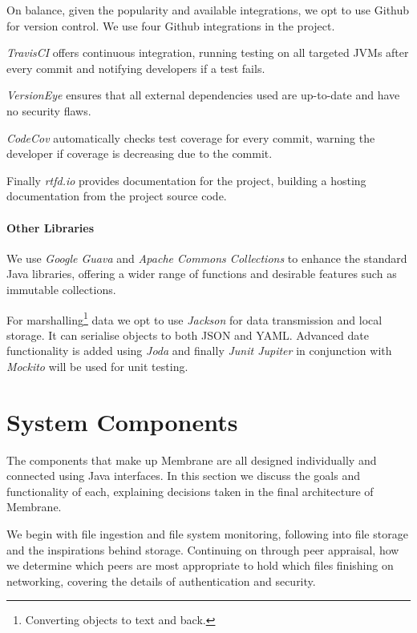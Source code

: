\documentclass[11pt, a4paper, twoside]{report}
\begin{document}
On balance, given the popularity and available integrations, we opt to use Github for version control. We use four Github integrations in the project.

\emph{TravisCI} offers continuous integration, running testing on all targeted JVMs after every commit and notifying developers if a test fails.

\emph{VersionEye} ensures that all external dependencies used are up-to-date and have no security flaws.

\emph{CodeCov} automatically checks test coverage for every commit, warning the developer if coverage is decreasing due to the commit.

Finally \emph{rtfd.io} provides documentation for the project, building a hosting documentation from the project source code.

\subsubsection{Other Libraries}

We use \emph{Google Guava} and \emph{Apache Commons Collections} to enhance the standard Java libraries, offering a wider range of functions and desirable features such as immutable collections.

For marshalling\footnote{Converting objects to text and back.} data we opt to use \emph{Jackson} for data transmission and local storage. It can serialise objects to both JSON and YAML. Advanced date functionality is added using \emph{Joda} and finally \emph{Junit Jupiter} in conjunction with \emph{Mockito} will be used for unit testing.









\chapter{System Components}

The components that make up Membrane are all designed individually and connected using Java interfaces. In this section we discuss the goals and functionality of each, explaining decisions taken in the final architecture of Membrane.

We begin with file ingestion and file system monitoring, following into file storage and the inspirations behind storage. Continuing on through peer appraisal, how we determine which peers are most appropriate to hold which files finishing on networking, covering the details of authentication and security.
\end{document}

